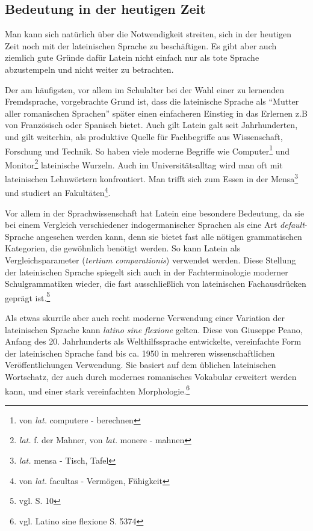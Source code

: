 \documentclass[fontsize=12pt,abstract=on,titlepage,bibliography=totoc,ngerman,listof=totoc]{scrreprt}
\begin{document}
\subsection{Bedeutung in der heutigen Zeit}
\label{subsec:bedeutung}
Man kann sich natürlich über die Notwendigkeit streiten, sich in der heutigen Zeit noch mit der lateinischen Sprache zu beschäftigen. Es gibt aber auch ziemlich gute Gründe dafür Latein nicht einfach nur als tote Sprache abzustempeln und nicht weiter zu betrachten. \par
Der am häufigsten, vor allem im Schulalter bei der Wahl einer zu lernenden Fremdsprache, vorgebrachte Grund ist, dass die lateinische Sprache als ``Mutter aller romanischen Sprachen'' später einen einfacheren Einstieg in das Erlernen z.B von Französisch oder Spanisch bietet. Auch gilt Latein galt seit Jahrhunderten, und gilt weiterhin, als produktive Quelle für Fachbegriffe aus Wissenschaft, Forschung und Technik. So haben viele moderne Begriffe wie Computer\footnote{von \textit{lat.} computere - berechnen} und Monitor\footnote{\textit{lat.} f. der Mahner, von \textit{lat.} monere - mahnen} lateinische Wurzeln. Auch im Universitätsalltag wird man oft mit lateinischen Lehnwörtern konfrontiert. Man trifft sich zum Essen in der Mensa\footnote{\textit{lat.} mensa - Tisch, Tafel} und studiert an Fakultäten\footnote{von \textit{lat.} facultas - Vermögen, Fähigkeit}. \par
Vor allem in der Sprachwissenschaft hat Latein eine besondere Bedeutung, da sie bei einem Vergleich verschiedener indogermanischer Sprachen als eine Art \textit{default}-Sprache angesehen werden kann, denn sie bietet fast alle nötigen grammatischen Kategorien, die gewöhnlich benötigt werden. So kann Latein als Vergleichsparameter (\textit{tertium comparationis}) verwendet werden. Diese Stellung der lateinischen Sprache spiegelt sich auch in der Fachterminologie moderner Schulgrammatiken wieder, die fast ausschließlich von lateinischen Fachausdrücken geprägt ist.\footnote{vgl. \cite{MUELLER-LANCE2006} S. 10} \par
Als etwas skurrile aber auch recht moderne Verwendung einer Variation der lateinischen Sprache kann \textit{latino sine flexione} gelten. Diese von Giuseppe Peano, Anfang des 20. Jahrhunderts als Welthilfssprache entwickelte, vereinfachte Form der lateinischen Sprache fand bis ca. 1950 in mehreren wissenschaftlichen Veröffentlichungen Verwendung. Sie basiert auf dem üblichen lateinischen Wortschatz, der auch durch modernes romanisches Vokabular erweitert werden kann, und einer stark vereinfachten Morphologie.\footnote{vgl. \cite{METZLER2004} Latino sine flexione S. 5374}
\pagebreak
\end{document}
